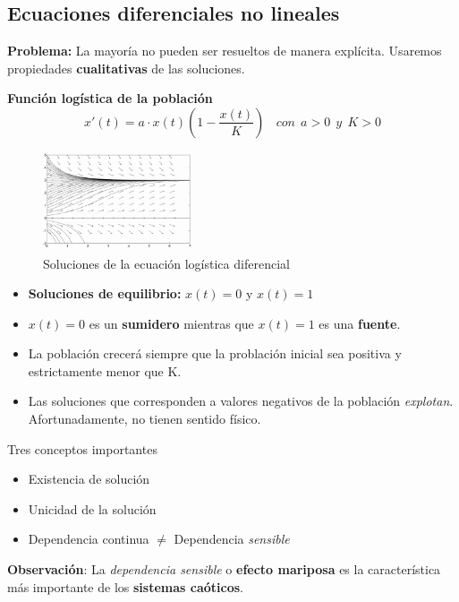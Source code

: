 \documentclass[8pt]{beamer}
\begin{document}
\subsection{Ecuaciones diferenciales no lineales}
\begin{frame}
\textbf{Problema:} La mayoría no pueden ser resueltos de manera explícita. Usaremos propiedades \textbf{cualitativas} de las soluciones.

\begin{example}
\textbf{Función logística de la población}
\begin{equation}
x'(t) = a\cdot x(t)(1-\frac{x(t)}{K})~~~~con~~a>0~~y~~K>0
\end{equation}
\end{example}
\end{frame}

\begin{frame}
\begin{figure}[hbtp]
\centering
\includegraphics[width = 0.4\textwidth]{img/poblacion.png}
\caption{Soluciones de la ecuación logística diferencial}
\end{figure}\label{fig:poblacion}

\begin{itemize}
\item \textbf{Soluciones de equilibrio:} $x(t) = 0$ y $x(t)=1$
\item $x(t) = 0$ es un \textbf{sumidero} mientras que $x(t)=1$ es una \textbf{fuente}.
\item La población crecerá siempre que la problación inicial sea positiva y estrictamente menor que K.
\item Las soluciones que corresponden a valores negativos de la población \emph{explotan}. Afortunadamente, no tienen sentido físico.
\end{itemize}
\end{frame}

\begin{frame}
\begin{block}{Tres conceptos importantes}
\begin{itemize}
\item Existencia de solución
\item Unicidad de la solución
\item Dependencia continua $\neq$ Dependencia \emph{sensible}
\end{itemize}
\end{block}
\textbf{Observación}: La \emph{dependencia sensible} o \textbf{efecto mariposa} es la característica más importante de los \textbf{sistemas caóticos}.
\end{frame}
\end{document}
